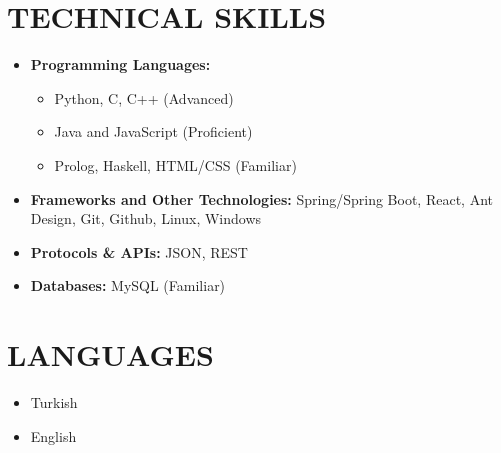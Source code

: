 \begin{minipage}[t]{0.8\textwidth}
  \section{TECHNICAL SKILLS}
    \begin{multicols}{2}
      \begin{itemize}[leftmargin=0.25in, itemsep=1pt]
        \item \textbf{Programming Languages:} 
          \begin{itemize}[label={-}, leftmargin=0.2in]
            \item Python, C, C++ (Advanced)
            \item Java and JavaScript (Proficient)
            \item Prolog, Haskell, HTML/CSS (Familiar)
          \end{itemize}
        \vspace*{\fill}

        \item \textbf{Frameworks and Other Technologies:} 
          Spring/Spring Boot, React, Ant Design, Git, Github, Linux, Windows
        
        \item \textbf{Protocols \& APIs:} 
          JSON, REST

        \item \textbf{Databases:} 
          MySQL (Familiar)
      \end{itemize}
    \end{multicols}
\end{minipage}
\begin{minipage}[t]{0.18\textwidth}
  \section{LANGUAGES}
  \begin{itemize}[leftmargin=0.25in, itemsep=1pt]
    \item Turkish
    \item English
  \end{itemize}
\end{minipage}
